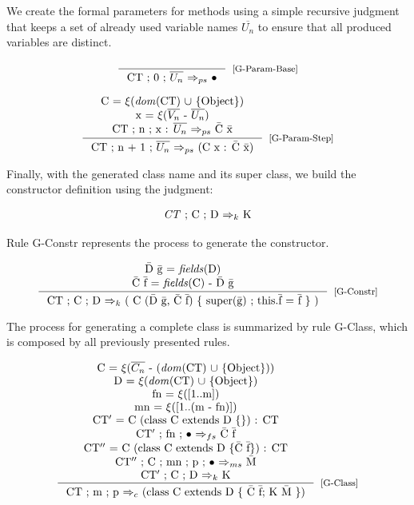 \documentclass[tese,capa,english]{texufpel}
\begin{document}
We create the formal parameters for methods using a simple recursive judgment that keeps a set of already used variable names $\overline{U_n}$ to ensure that all produced variables are distinct.

\[
\inference{}
          {\textrm{CT ; 0 ; $\overline{U_n}$ $\Rightarrow_{ps}$ $\bullet$}}[\footnotesize{[G-Param-Base]}]
\]

\[
\inference{\textrm{C = $\xi$(\emph{dom}(CT) $\cup$ \{Object\})} \\
           \textrm{x = $\xi$($\overline{V_n}$ - $\overline{U_n}$)} \\
           \textrm{CT ; n ; x : $\overline{U_n}$ $\Rightarrow_{ps}$ \={C} \={x}}}
          {\textrm{CT ; n + 1 ; $\overline{U_n}$ $\Rightarrow_{ps}$ (C x : \={C} \={x})}}[\footnotesize{[G-Param-Step]}]
\]

Finally, with the generated class name and its super class, we build the constructor definition using the judgment:

\[
\textrm{\emph{CT} ; C ; D $\Rightarrow_k$ K}
\]

Rule {\footnotesize G-Constr} represents the process to generate the constructor.

\[
\inference{\textrm{\={D} \={g} = \emph{fields}(D)} \\
           \textrm{\={C} \={f} = \emph{fields}(C) - \={D} \={g}}}
          {\textrm{CT ; C ; D $\Rightarrow_k$ ( C (\={D} \={g}, \={C} \={f}) \{ super(\={g}) ; this.\={f} = \={f} \} )}}[\footnotesize{[G-Constr]}]
\]

\pagebreak

The process for generating a complete class is summarized by rule {\footnotesize G-Class}, which is composed by all previously presented rules.

\[
\inference{\textrm{C = $\xi$($\overline{C_n}$ - (\emph{dom}(CT) $\cup$ \{Object\}))} \\
           \textrm{D = $\xi$(\emph{dom}(CT) $\cup$ \{Object\})} \\
           \textrm{fn = $\xi$([$1 .. $m])} \\
           \textrm{mn = $\xi$([$1 .. $(m - fn)])} \\
           \textrm{CT$'$ = C (class C extends D \{\}) : CT} \\
           \textrm{CT$'$ ; fn ; $\bullet$ $\Rightarrow_{fs}$ \={C} \={f}} \\
           \textrm{CT$''$ = C (class C extends D \{\={C} \={f}\}) : CT} \\
           \textrm{CT$''$ ; C ; mn ; p ; $\bullet$ $\Rightarrow_{ms}$ \={M}} \\
           \textrm{CT$'$ ; C ; D $\Rightarrow_k$ K}}
          {\textrm{CT ; m ; p $\Rightarrow_c$ (class C extends D \{ \={C} \={f}; K \={M} \})}}[\footnotesize{[G-Class]}]
\]
\end{document}
